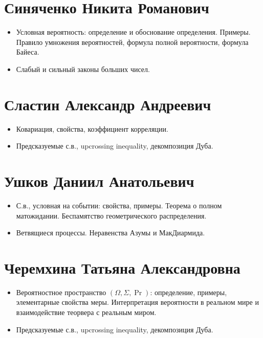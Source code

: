 \documentclass[12pt]{article}
\begin{document}
\section{Синяченко Никита Романович}

\begin{itemize}
  \item Условная вероятность: определение и обоснование определения. Примеры. Правило умножения вероятностей, формула полной вероятности, формула Байеса.
  \item Слабый и сильный законы больших чисел.
\end{itemize}

\section{Сластин Александр Андреевич}

\begin{itemize}
  \item Ковариация, свойства, коэффициент корреляции.
  \item Предсказуемые с.в., upcrossing inequality, декомпозиция Дуба.
\end{itemize}

\section{Ушков Даниил Анатольевич}

\begin{itemize}
  \item С.в., условная на событии: свойства, примеры. Теорема о полном матожидании. Беспамятство геометрического распределения.
  \item Ветвящиеся процессы. Неравенства Азумы и МакДиармида.
\end{itemize}

\section{Черемхина Татьяна Александровна}

\begin{itemize}
  \item Вероятностное пространство $(\Omega, \Sigma, \Pr)$: определение, примеры, элементарные свойства меры. Интерпретация вероятности в реальном мире и взаимодействие теорвера с реальным миром.
  \item Предсказуемые с.в., upcrossing inequality, декомпозиция Дуба.
\end{itemize}
\end{document}
